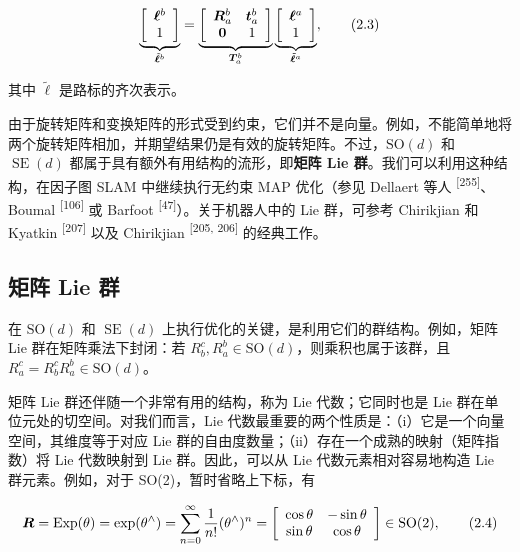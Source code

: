 \begin{equation}
\underbrace {\left[ \begin{array}{c} \boldsymbol {\ell} ^ {b} \\ 1 \end{array} \right]} _ {\tilde {\boldsymbol {\ell}} ^ {b}} = \underbrace {\left[ \begin{array}{c c} \boldsymbol {R} _ {a} ^ {b} & \boldsymbol {t} _ {a} ^ {b} \\ \boldsymbol {0} & 1 \end{array} \right]} _ {\boldsymbol {T} _ {a} ^ {b}} \underbrace {\left[ \begin{array}{c} \boldsymbol {\ell} ^ {a} \\ 1 \end{array} \right]} _ {\tilde {\boldsymbol {\ell}} ^ {a}},\tag{2.3}
\end{equation}

其中 $\tilde\ell$ 是路标的齐次表示。

由于旋转矩阵和变换矩阵的形式受到约束，它们并不是向量。例如，不能简单地将两个旋转矩阵相加，并期望结果仍是有效的旋转矩阵。不过，$\mathrm{SO}(d)$ 和 $\operatorname{SE}(d)$ 都属于具有额外有用结构的流形，即\textbf{矩阵 Lie 群}。我们可以利用这种结构，在因子图 SLAM 中继续执行无约束 MAP 优化（参见 Dellaert 等人 \textsuperscript{[255]}、Boumal \textsuperscript{[106]} 或 Barfoot \textsuperscript{[47]}）。关于机器人中的 Lie 群，可参考 Chirikjian 和 Kyatkin \textsuperscript{[207]} 以及 Chirikjian \textsuperscript{[205, 206]} 的经典工作。

\subsection{矩阵 Lie 群}

在 $\mathrm{SO}(d)$ 和 $\operatorname{SE}(d)$ 上执行优化的关键，是利用它们的群结构。例如，矩阵 Lie 群在矩阵乘法下封闭：若 $R_b^c,R_a^b\in\mathrm{SO}(d)$，则乘积也属于该群，且 $R_a^c=R_b^cR_a^b\in\mathrm{SO}(d)$。

矩阵 Lie 群还伴随一个非常有用的结构，称为 Lie 代数；它同时也是 Lie 群在单位元处的切空间。对我们而言，Lie 代数最重要的两个性质是：（i）它是一个向量空间，其维度等于对应 Lie 群的自由度数量；（ii）存在一个成熟的映射（矩阵指数）将 Lie 代数映射到 Lie 群。因此，可以从 Lie 代数元素相对容易地构造 Lie 群元素。例如，对于 SO(2)，暂时省略上下标，有

\begin{equation}
\boldsymbol {R} = \operatorname {Exp} (\theta) = \exp (\theta^ {\wedge}) = \sum _ {n = 0} ^ {\infty} \frac {1}{n !} (\theta^ {\wedge}) ^ {n} = \left[ \begin{array}{c c} \cos \theta & - \sin \theta \\ \sin \theta & \cos \theta \end{array} \right] \in \operatorname {SO} (2),\tag{2.4}
\end{equation}

